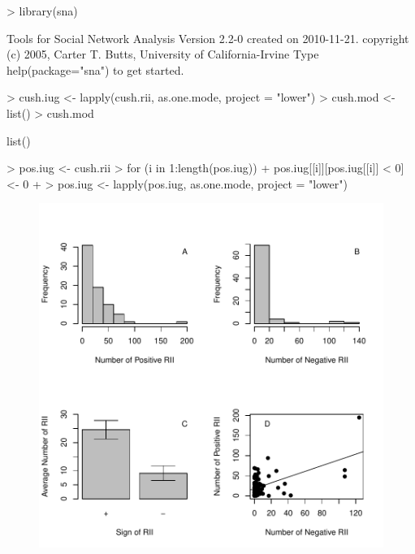 \documentclass[12pt]{article}
\begin{document}
\begin{Schunk}
\begin{Sinput}
> library(sna)
\end{Sinput}
\begin{Soutput}
     Tools for Social Network Analysis
Version      2.2-0 created on      2010-11-21.
copyright (c) 2005, Carter T. Butts, University of California-Irvine
Type help(package="sna") to get started.
\end{Soutput}
\begin{Sinput}
> cush.iug <- lapply(cush.rii, as.one.mode, project = "lower")
> cush.mod <- list()
> cush.mod
\end{Sinput}
\begin{Soutput}
list()
\end{Soutput}
\begin{Sinput}
> pos.iug <- cush.rii
> for (i in 1:length(pos.iug)) {
+     pos.iug[[i]][pos.iug[[i]] < 0] <- 0
+ }
> pos.iug <- lapply(pos.iug, as.one.mode, project = "lower")
\end{Sinput}
\end{Schunk}

\begin{figure} 
\begin{center} 
\includegraphics{GoFN-fig1}
\end{center} 
\caption{}
\label{fig:one}
\end{figure}
\end{document}
